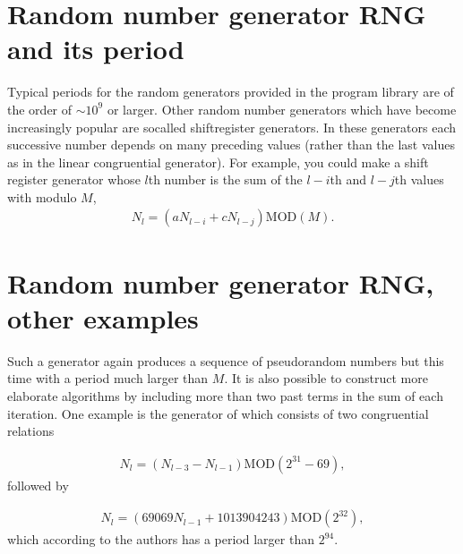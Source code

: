 \documentclass[letterpaper,10pt,english]{sphinxmanual}
\begin{document}
\section{Random number generator RNG and its period}
\label{\detokenize{chapter3:random-number-generator-rng-and-its-period}}
Typical periods for the random generators provided in the program library
are of the order of \(\sim 10^9\) or larger. Other random number generators which have
become increasingly popular are so\sphinxhyphen{}called shift\sphinxhyphen{}register generators.
In these generators each successive number depends on many preceding
values (rather than the last values as in the linear congruential
generator).
For example, you could make a shift register generator whose \(l\)th
number is the sum of the \(l-i\)th and \(l-j\)th values with modulo \(M\),
\begin{equation*}
\begin{split}
N_l=(aN_{l-i}+cN_{l-j})\mathrm{MOD}(M).
\end{split}
\end{equation*}

\section{Random number generator RNG, other examples}
\label{\detokenize{chapter3:random-number-generator-rng-other-examples}}
Such a generator again produces a sequence of pseudorandom numbers
but this time with a period much larger than \(M\).
It is also possible to construct more elaborate algorithms by including
more than two past terms in the sum of each iteration.
One example is the generator of 
which consists of two congruential relations




\begin{equation*}
\begin{split}
\begin{equation}
   N_l=(N_{l-3}-N_{l-1})\mathrm{MOD}(2^{31}-69),
\label{eq:mz1} \tag{12}
\end{equation}
\end{split}
\end{equation*}
followed by




\begin{equation*}
\begin{split}
\begin{equation}
   N_l=(69069N_{l-1}+1013904243)\mathrm{MOD}(2^{32}),
\label{eq:mz2} \tag{13}
\end{equation}
\end{split}
\end{equation*}
which according to the authors has a period larger than \(2^{94}\).
\end{document}

